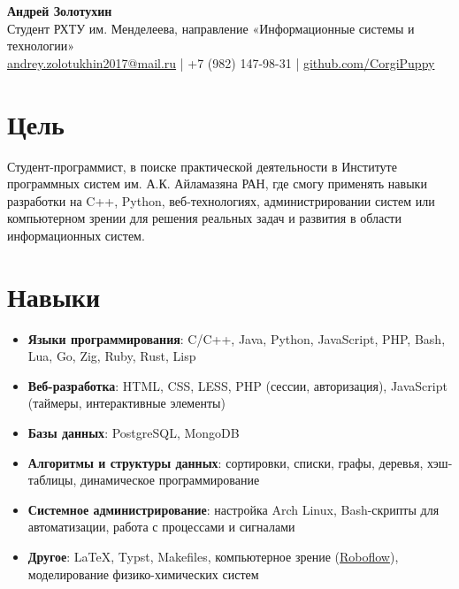 \documentclass[a4paper,11pt]{article}
\begin{document}
	\begin{center}
		{\Large\bfseries Андрей Золотухин} \\
		\vspace{0.2cm}
		Студент РХТУ им. Менделеева, направление «Информационные системы и технологии» \\
		\href{mailto:andrey.zolotukhin2017@mail.ru}{andrey.zolotukhin2017@mail.ru} | +7 (982) 147-98-31 | \href{https://github.com/CorgiPuppy}{github.com/CorgiPuppy}
	\end{center}

	\section{Цель}
	Студент-программист, в поиске практической деятельности в Институте программных систем им. А.К. Айламазяна РАН, где смогу применять навыки разработки на C++, Python, веб-технологиях, администрировании систем или компьютерном зрении для решения реальных задач и развития в области информационных систем.

	\section{Навыки}
	\begin{itemize}[leftmargin=*]
		\item \textbf{Языки программирования}: C/C++, Java, Python, JavaScript, PHP, Bash, Lua, Go, Zig, Ruby, Rust, Lisp
		\item \textbf{Веб-разработка}: HTML, CSS, LESS, PHP (сессии, авторизация), JavaScript (таймеры, интерактивные элементы)
		\item \textbf{Базы данных}: PostgreSQL, MongoDB
		\item \textbf{Алгоритмы и структуры данных}: сортировки, списки, графы, деревья, хэш-таблицы, динамическое программирование
		\item \textbf{Системное администрирование}: настройка Arch Linux, Bash-скрипты для автоматизации, работа с процессами и сигналами
		\item \textbf{Другое}: LaTeX, Typst, Makefiles, компьютерное зрение (\href{https://roboflow.com/}{Roboflow}), моделирование физико-химических систем
	\end{itemize}

\end{document}
